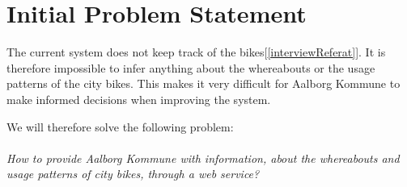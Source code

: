 \section*{Initial Problem Statement}

The current system does not keep track of the bikes[\cref{interviewReferat}]. It is therefore impossible to infer anything about the whereabouts or the usage patterns of the city bikes.
This makes it very difficult for Aalborg Kommune to make informed decisions when improving the system. 

We will therefore solve the following problem:\\\\
\textit{How to provide Aalborg Kommune with information, about the whereabouts and usage patterns of city bikes, through a web service?}


%
%
%
